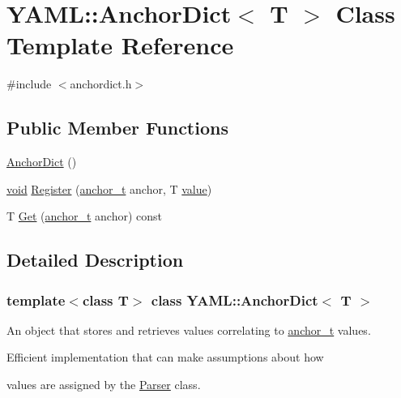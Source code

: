 \hypertarget{class_y_a_m_l_1_1_anchor_dict}{}\section{Y\+A\+ML\+::Anchor\+Dict$<$ T $>$ Class Template Reference}
\label{class_y_a_m_l_1_1_anchor_dict}


{\ttfamily \#include $<$anchordict.\+h$>$}

\subsection*{Public Member Functions}
\begin{DoxyCompactItemize}
\item 
\mbox{\hyperlink{class_y_a_m_l_1_1_anchor_dict_a2472cae3dce3afbb39023be24376dcaa}{Anchor\+Dict}} ()
\item 
\mbox{\hyperlink{glad_8h_a950fc91edb4504f62f1c577bf4727c29}{void}} \mbox{\hyperlink{class_y_a_m_l_1_1_anchor_dict_af75e353e954d3637f83773d595b3ef26}{Register}} (\mbox{\hyperlink{namespace_y_a_m_l_abeff1798814ae3402fc5665fdcad1de6}{anchor\+\_\+t}} anchor, T \mbox{\hyperlink{glad_8h_a03aff08f73d7fde3d1a08e0abd8e84fa}{value}})
\item 
T \mbox{\hyperlink{class_y_a_m_l_1_1_anchor_dict_acbdb0e5aa6b28ce1caa6b8cc7074cc01}{Get}} (\mbox{\hyperlink{namespace_y_a_m_l_abeff1798814ae3402fc5665fdcad1de6}{anchor\+\_\+t}} anchor) const
\end{DoxyCompactItemize}


\subsection{Detailed Description}
\subsubsection*{template$<$class T$>$\newline
class Y\+A\+M\+L\+::\+Anchor\+Dict$<$ T $>$}

An object that stores and retrieves values correlating to \mbox{\hyperlink{namespace_y_a_m_l_abeff1798814ae3402fc5665fdcad1de6}{anchor\+\_\+t}} values.

Efficient implementation that can make assumptions about how 
\begin{DoxyCode}{0}
\end{DoxyCode}
 values are assigned by the \mbox{\hyperlink{class_y_a_m_l_1_1_parser}{Parser}} class. 

